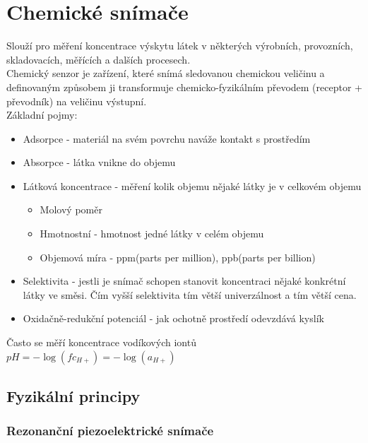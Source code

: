 \section{Chemické snímače}
Slouží pro měření koncentrace výskytu látek v některých výrobních, provozních, skladovacích, měřících a dalších procesech.\\
Chemický senzor je zařízení, které snímá sledovanou chemickou veličinu a definovaným způsobem ji transformuje chemicko-fyzikálním převodem (receptor + převodník) na veličinu výstupní.\\
Základní pojmy:
\begin{itemize}
    \item Adsorpce - materiál na svém povrchu naváže kontakt s prostředím
    \item Absorpce - látka vnikne do objemu
    \item Látková koncentrace - měření kolik objemu nějaké látky je v celkovém objemu
          \begin{itemize}
              \item Molový poměr
              \item Hmotnostní - hmotnost jedné látky v celém objemu
              \item Objemová míra - ppm(parts per million), ppb(parts per billion)
          \end{itemize}
    \item Selektivita - jestli je snímač schopen stanovit koncentraci nějaké konkrétní látky ve směsi. Čím vyšší selektivita tím větší univerzálnost a tím větší cena.
    \item Oxidačně-redukční potenciál - jak ochotně prostředí odevzdává kyslík
\end{itemize}
Často se měří koncentrace vodíkových iontů \(pH = -\log(fc_{H+}) = -\log(a_{H+})\)\\

\subsection{Fyzikální principy}
\subsubsection{Rezonanční piezoelektrické snímače}
